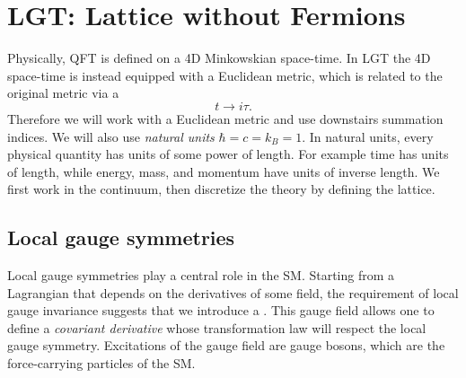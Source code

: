 \chapter{LGT: Lattice without Fermions}\label{ch:preliminaries}

Physically, QFT is defined on a 4D Minkowskian space-time. In LGT 
the 4D space-time is instead equipped with a Euclidean metric, which is 
related to the original metric via a 
\begin{equation}
  t\to i\tau.
\end{equation} 
Therefore we will work with a Euclidean metric
and use downstairs summation indices. 
We will also use {\it natural units}
$\hbar=c=k_B=1$. In natural units, every physical
quantity has units of some power of length. For example
time has units of length, while energy, mass, and momentum
have units of inverse length. 
We first work in the continuum, then 
discretize the theory by defining the lattice.

\section{Local gauge symmetries}

Local gauge symmetries play a central role in the SM. 
Starting from a Lagrangian that depends on the derivatives of
some field, the requirement of local gauge invariance suggests that
we introduce a . 
This gauge field allows one to define a {\it covariant derivative} 
 whose transformation law will 
respect the local gauge symmetry.
Excitations of the gauge field are gauge bosons,
which are the force-carrying particles of the SM.

